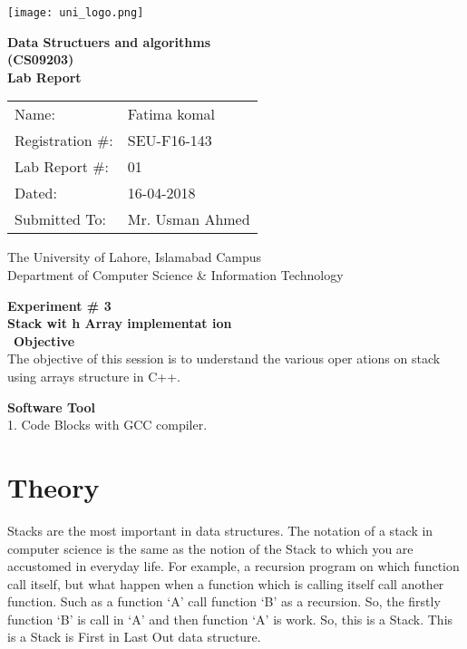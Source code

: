 \documentclass[11pt]{article}            %
\begin{document}
\begin{titlepage}
    \centering
  \vfill
    \texttt{[image: uni\_logo.png]} \\ 
	\vskip2cm
    {\bfseries\Large
	Data Structuers and algorithms \\ (CS09203)\\
	
	\vskip2cm
	Lab Report 
	 
	\vskip2cm
	}    

\begin{center}
\begin{tabular}{ l l  } 

Name: & Fatima komal \\ 
Registration \#: & SEU-F16-143 \\ 
Lab Report \#: & 01 \\ 
 Dated:& 16-04-2018\\ 
Submitted To:& Mr. Usman Ahmed\\ 

\end{tabular}
\end{center}
    \vfill
    The University of Lahore, Islamabad Campus\\
Department of Computer Science \& Information Technology
\end{titlepage}


    
    {\bfseries\Large
\centering
	Experiment \# 3\\

Stack wit h Array implementat ion  \\
	
	}    
 \vskip1cm\ 
 \textbf {Objective}\\The objective of this session is to understand the various oper ations on stack using arrays structure 
in C++. 
 
 \textbf {Software Tool} \\
 1.  Code Blocks with GCC compiler.    
   

\section{Theory }              

Stacks are the most important in data structures. The notation of  a stack in computer science is the 
same as the notion  of the  Stack to which you are accustomed in everyday  life. For  example, a 
recursion program on which function call itself, but what happen when a function which is calling 
itself call another function. Such as a function ‘A’ call function ‘B’ as a recursion. So, the firstly 
function ‘B’ is call in ‘A’ and then function ‘A’ is work. So, this is a Stack. This is a Stack is First 
in Last Out data structure. 
 
\end{document}

